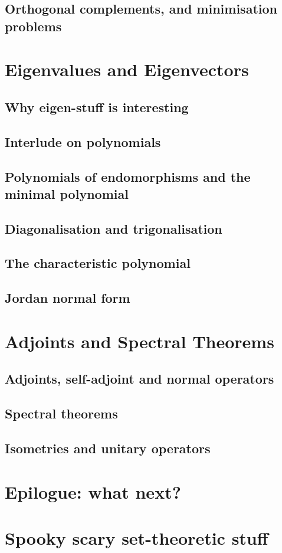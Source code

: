 \documentclass{book}
\theoremstyle{plain}
\theoremstyle{definition}
\theoremstyle{remark}
\begin{document}
\section{Orthogonal complements, and minimisation problems}

\chapter{Eigenvalues and Eigenvectors}

\section{Why eigen-stuff is interesting}

\section{Interlude on polynomials}

\section{Polynomials of endomorphisms and the minimal polynomial}

\section{Diagonalisation and trigonalisation}

\section{The characteristic polynomial}

\section{Jordan normal form}

\chapter{Adjoints and Spectral Theorems}

\section{Adjoints, self-adjoint and normal operators}

\section{Spectral theorems}

\section{Isometries and unitary operators}

\chapter*{Epilogue: what next?}

\appendix

\chapter{Spooky scary set-theoretic stuff}
\end{document}
